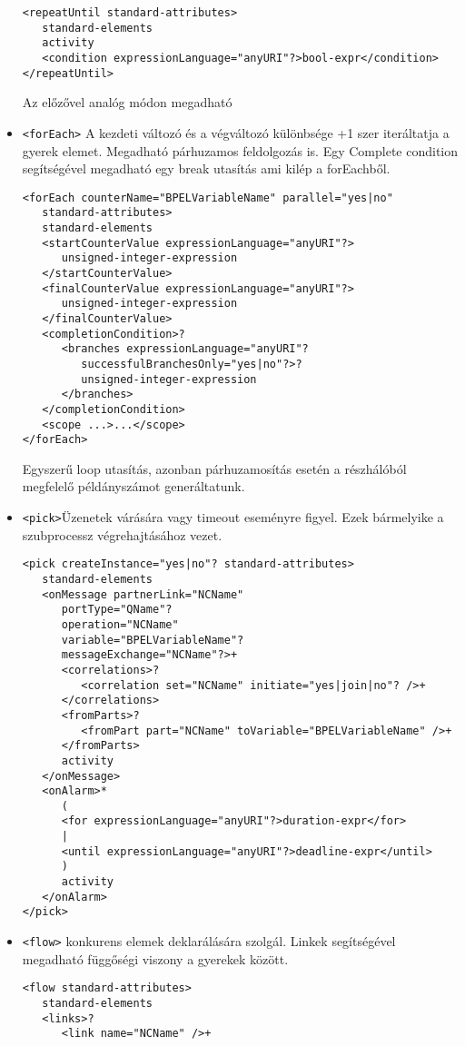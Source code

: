 \documentclass[12pt,a4paper]{book}
\begin{document}
\begin{itemize}
\begin{verbatim}
<repeatUntil standard-attributes>
   standard-elements
   activity
   <condition expressionLanguage="anyURI"?>bool-expr</condition>
</repeatUntil>
\end{verbatim}
Az előzővel analóg módon megadható
\item \texttt{<forEach>} A kezdeti változó és a végváltozó különbsége +1 szer iteráltatja a gyerek elemet. Megadható párhuzamos feldolgozás is. Egy Complete condition segítségével megadható egy break utasítás ami kilép a forEachből. 
\begin{verbatim}
<forEach counterName="BPELVariableName" parallel="yes|no"
   standard-attributes>
   standard-elements
   <startCounterValue expressionLanguage="anyURI"?>
      unsigned-integer-expression
   </startCounterValue>
   <finalCounterValue expressionLanguage="anyURI"?>
      unsigned-integer-expression
   </finalCounterValue>
   <completionCondition>?
      <branches expressionLanguage="anyURI"?
         successfulBranchesOnly="yes|no"?>?
         unsigned-integer-expression
      </branches>
   </completionCondition>
   <scope ...>...</scope>
</forEach>
\end{verbatim} Egyszerű loop utasítás, azonban párhuzamosítás esetén a részhálóból megfelelő példányszámot generáltatunk. 
\item \texttt{<pick>}Üzenetek várására vagy timeout eseményre figyel. Ezek bármelyike a szubprocessz végrehajtásához vezet. 
\begin{verbatim}
<pick createInstance="yes|no"? standard-attributes>
   standard-elements
   <onMessage partnerLink="NCName"
      portType="QName"?
      operation="NCName"
      variable="BPELVariableName"?
      messageExchange="NCName"?>+
      <correlations>?
         <correlation set="NCName" initiate="yes|join|no"? />+
      </correlations>
      <fromParts>?
         <fromPart part="NCName" toVariable="BPELVariableName" />+
      </fromParts>
      activity
   </onMessage>
   <onAlarm>*
      (
      <for expressionLanguage="anyURI"?>duration-expr</for>
      |
      <until expressionLanguage="anyURI"?>deadline-expr</until>
      )
      activity
   </onAlarm>
</pick>
\end{verbatim}
\item \texttt{<flow>} konkurens elemek deklarálására szolgál. Linkek segítségével megadható függőségi viszony a gyerekek között. 
\begin{verbatim}
<flow standard-attributes>
   standard-elements
   <links>?
      <link name="NCName" />+

\end{verbatim}
\end{itemize}
\end{document}
